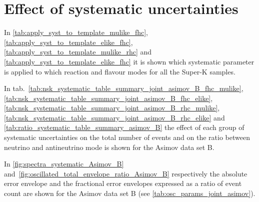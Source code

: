 
%
%

\section{Effect of systematic uncertainties}
\label{app:systematics}

In \cref{tab:apply_syst_to_template_mulike_fhc},
\cref{tab:apply_syst_to_template_elike_fhc},
\cref{tab:apply_syst_to_template_mulike_rhc} and
\cref{tab:apply_syst_to_template_elike_fhc}
it is shown which systematic parameter is applied to which reaction and flavour modes 
for all the Super-K samples.
 
\afterpage{}
\afterpage{}
\afterpage{}
\afterpage{}

\clearpage


In tab.~\ref{tab:nsk_systematic_table_summary_joint_asimov_B_fhc_mulike},
\ref{tab:nsk_systematic_table_summary_joint_asimov_B_fhc_elike},
\ref{tab:nsk_systematic_table_summary_joint_asimov_B_rhc_mulike},
\ref{tab:nsk_systematic_table_summary_joint_asimov_B_rhc_elike}
and 
\ref{tab:ratio_systematic_table_summary_asimov_B}
the effect of each group of systematic uncertainties 
on the total number of events and on the ratio 
between neutrino and antineutrino mode is shown for the Asimov data set B.




In \cref{fig:spectra_systematic_Asimov_B} and~\ref{fig:oscillated_total_envelope_ratio_Asimov_B}
respectively the absolute error envelope and the fractional error envelopes expressed as a ratio of event count 
are shown for the Asimov data set B (see \cref{tab:osc_params_joint_asimov}).

